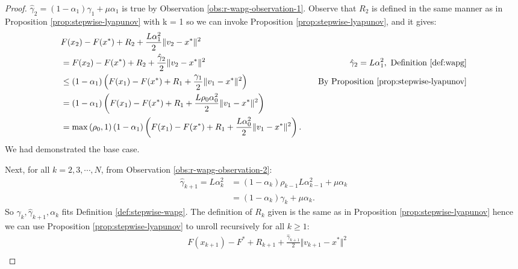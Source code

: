 \documentclass[12pt]{article}
\begin{document}
    \begin{proof}  
        $\hat \gamma_2 = (1 - \alpha_1)\gamma_1 + \mu \alpha_1$ is true by Observation \ref{obs:r-wapg-observation-1}. 
        Observe that $R_2$ is defined in the same manner as in Proposition \ref{prop:stepwise-lyapunov} with k = 1 so we can invoke Proposition \ref{prop:stepwise-lyapunov}, and it gives: 
        \begin{align*}
            & F(x_{2}) - F(x^*) + R_2 + \frac{L \alpha_1^2}{2}\Vert v_{2} - x^*\Vert^2
            \\
            & = F(x_{2}) - F(x^*) + R_2 + \frac{\hat \gamma_{2}}{2}\Vert v_{2} - x^*\Vert^2
            & \hat \gamma_2 = L \alpha_1^2 , \text{ Definition \ref{def:wapg}}
            \\
            &\le 
            (1 - \alpha_1)\left(
                F(x_1) - F(x^*) + R_1 + \frac{\gamma_1}{2}\Vert v_1 - x^*\Vert^2
            \right) 
            & \quad \text{By Proposition \ref{prop:stepwise-lyapunov}}
            \\
            &= 
            (1 - \alpha_1)\left(
                F(x_1) - F(x^*) + R_1 + \frac{L\rho_{0}\alpha_{0}^2}{2}\Vert v_1 - x^*\Vert^2
            \right) 
            \\
            &= \max\left(\rho_0, 1\right)
            (1 - \alpha_1)\left(
                F(x_1) - F(x^*) + R_1 + \frac{L\alpha_0^2}{2}\Vert v_1 - x^*\Vert^2
            \right). 
        \end{align*}
        We had demonstrated the base case. 
        \par 
        Next, for all $k = 2, 3, \cdots, N$, from Observation \ref{obs:r-wapg-observation-2}: 
        \begin{align*}
            \hat \gamma_{k + 1} = L\alpha_{k}^2 
            &=(1 - \alpha_k)\rho_{k - 1}L\alpha_{k - 1}^2 + \mu\alpha_k
            \\
            &= (1 - \alpha_k)\gamma_k + \mu\alpha_k. 
        \end{align*}
        So $\gamma_k, \hat \gamma_{k + 1}, \alpha_k$ fits Definition \ref{def:stepwise-wapg}. 
        The definition of $R_k$ given is the same as in Proposition \ref{prop:stepwise-lyapunov} hence we can use Proposition \ref{prop:stepwise-lyapunov} to unroll recursively for all $k \ge 1$: 
        {\small
        \begin{align*}
            &
            F(x_{k + 1}) - F^* + R_{k + 1} + \frac{\hat\gamma_{k + 1}}{2}\Vert v_{k + 1} - x^*\Vert^2 
            \\

\end{align*}}
\end{proof}
\end{document}
